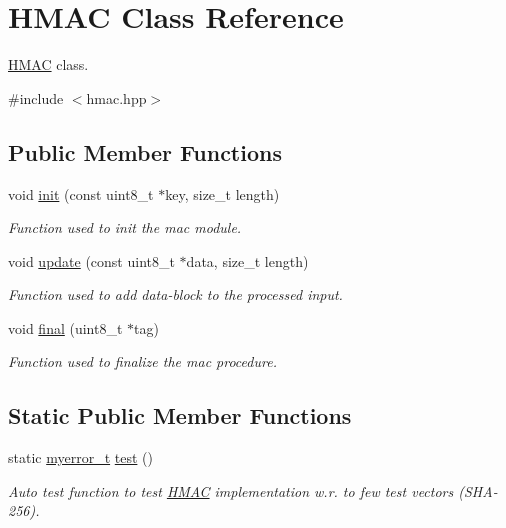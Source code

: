 \hypertarget{classHMAC}{}\section{H\+M\+A\+C Class Reference}
\label{classHMAC}


\hyperlink{classHMAC}{H\+M\+A\+C} class.  




{\ttfamily \#include $<$hmac.\+hpp$>$}

\subsection*{Public Member Functions}
\begin{DoxyCompactItemize}
\item 
void \hyperlink{classHMAC_af1a48c84179f5fa75db1a226dd9f4784}{init} (const uint8\+\_\+t $\ast$key, size\+\_\+t length)
\begin{DoxyCompactList}\small\item\em Function used to init the mac module. \end{DoxyCompactList}\item 
void \hyperlink{classHMAC_a5b9524a8e0940a487790465f5d0b60dc}{update} (const uint8\+\_\+t $\ast$data, size\+\_\+t length)
\begin{DoxyCompactList}\small\item\em Function used to add data-\/block to the processed input. \end{DoxyCompactList}\item 
void \hyperlink{classHMAC_a354fa05b4188049bdee0d70ddda0558c}{final} (uint8\+\_\+t $\ast$tag)
\begin{DoxyCompactList}\small\item\em Function used to finalize the mac procedure. \end{DoxyCompactList}\end{DoxyCompactItemize}
\subsection*{Static Public Member Functions}
\begin{DoxyCompactItemize}
\item 
static \hyperlink{error_8hpp_acabd2917084445509becf54ab64a4bd0}{myerror\+\_\+t} \hyperlink{classHMAC_a7c151dae82d31295a73c4a2d7e27e45a}{test} ()
\begin{DoxyCompactList}\small\item\em Auto test function to test \hyperlink{classHMAC}{H\+M\+A\+C} implementation w.\+r. to few test vectors (S\+H\+A-\/256). \end{DoxyCompactList}\end{DoxyCompactItemize}
